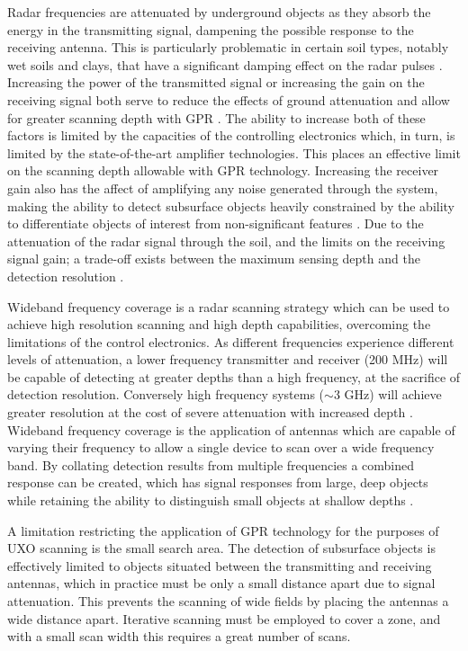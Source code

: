 \documentclass[main.tex]{subfiles}
\begin{document}
Radar frequencies are attenuated by underground objects as they absorb the energy in the transmitting signal, dampening the possible response to the receiving antenna. This is particularly problematic in certain soil types, notably wet soils and clays, that have a significant damping effect on the radar pulses \parencite{sakaguchi2014}. Increasing the power of the transmitted signal or increasing the gain on the receiving signal both serve to reduce the effects of ground attenuation and allow for greater scanning depth with GPR \parencite{Ho2008}. The ability to increase both of these factors is limited by the capacities of the controlling electronics which, in turn, is limited by the state-of-the-art amplifier technologies. This places an effective limit on the scanning depth allowable with GPR technology. Increasing the receiver gain also has the affect of amplifying any noise generated through the system, making the ability to detect subsurface objects heavily constrained by the ability to differentiate objects of interest from non-significant features \parencite{shresta2003}. Due to the attenuation of the radar signal through the soil, and the limits on the receiving signal gain; a trade-off exists between the maximum sensing depth and the detection resolution \parencite{Ho2008}.

Wideband frequency coverage is a radar scanning strategy which can be used to achieve high resolution scanning and high depth capabilities, overcoming the limitations of the control electronics. As different frequencies experience different levels of attenuation, a lower frequency transmitter and receiver (200 MHz) will be capable of detecting at greater depths than a high frequency, at the sacrifice of detection resolution. Conversely high frequency systems ($\sim$3 GHz) will achieve greater resolution at the cost of severe attenuation with increased depth \parencite{shresta2003}. Wideband frequency coverage is the application of antennas which are capable of varying their frequency to allow a single device to scan over a wide frequency band. By collating detection results from multiple frequencies a combined response can be created, which has signal responses from large, deep objects while retaining the ability to distinguish small objects at shallow depths \parencite{3dradarDXG}.

A limitation restricting the application of GPR technology for the purposes of UXO scanning is the small search area. The detection of subsurface objects is effectively limited to objects situated between the transmitting and receiving antennas, which in practice must be only a small distance apart due to signal attenuation. This prevents the scanning of wide fields by placing the antennas a wide distance apart. Iterative scanning must be employed to cover a zone, and with a small scan width this requires a great number of scans.
\end{document}
